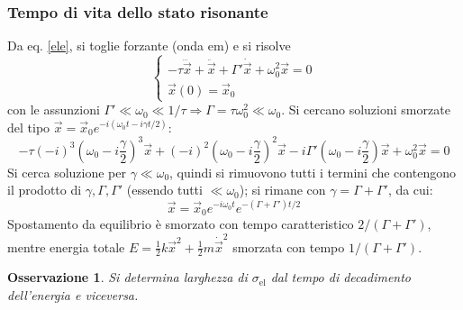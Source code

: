 \documentclass[10pt, a4paper]{scrartcl}
\numberwithin{equation}{subsection}
\theoremstyle{style1}
\newtheorem{osservazione}{Osservazione}[section]
\begin{document}
\subsubsection{Tempo di vita dello stato risonante}
Da eq. \ref{ele}, si toglie forzante (onda em) e si risolve
\begin{equation}
	\begin{cases}
		-\tau  \dddot{\vec{x}} + \ddot{\vec{x}} + \Gamma' \dot{\vec{x}}+\omega_0^2 \vec{x} = 0 \\
		\vec{x}(0) = \vec{x}_0
	\end{cases}
\end{equation}
con le assunzioni $\Gamma ' \ll\omega_0 \ll 1 / \tau \Rightarrow \Gamma = \tau  \omega^2_0 \ll \omega_0$. Si cercano soluzioni smorzate del tipo $\vec{x} = \vec{x}_0 e^{-i(\omega_0 t - i \gamma t / 2)} $:
\begin{equation*}
	-\tau(-i)^3 \left(\omega_0 - i \frac{\gamma}{2}\right) ^3 \vec{x} + (-i)^2 \left(\omega_0 - i \frac{\gamma}{2}\right) ^2 \vec{x} - i \Gamma' \left(\omega_0 - i \frac{\gamma}{2}\right)  \vec{x}+\omega_0^2 \vec{x}=0
\end{equation*}
Si cerca soluzione per $\gamma\ll\omega_0$, quindi si rimuovono tutti i termini che contengono il prodotto di $\gamma, \Gamma, \Gamma'$ (essendo tutti $\ll \omega_0$); si rimane con $\gamma = \Gamma+ \Gamma'$, da cui:
\begin{equation}
	\vec{x}= \vec{x}_0 e^{-i\omega_0 t }  e^{-(\Gamma+\Gamma') t / 2} 
\end{equation}
Spostamento da equilibrio \`e smorzato con tempo caratteristico $2/(\Gamma+\Gamma')$, mentre energia totale $E = \frac{1}{2} k \vec{x}^2 + \frac{1}{2}m\dot{\vec{x}}^2$ smorzata con tempo $1 / (\Gamma + \Gamma')$.
\begin{osservazione}
Si determina larghezza di $\sigma _\text{el}$ dal tempo di decadimento dell'energia e viceversa.	
\end{osservazione}
\end{document}
